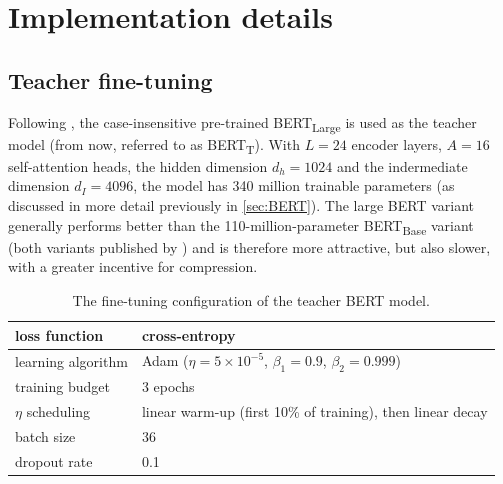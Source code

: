 \documentclass[bsc,frontabs,singlespacing,parskip,deptreport]{infthesis}
\def\BERTT{BERT\textsubscript{T}}
\begin{document}
{  \section{Implementation details}{
    \label{sec:implementation-details}
    \subsection{Teacher fine-tuning}{
      Following \citet{Tang_2019b}, the case-insensitive pre-trained BERT\textsubscript{Large} is used as the teacher model (from now, referred to as \BERTT).
      With $L=24$ encoder layers, $A=16$ self-attention heads, the hidden dimension $d_h=1024$ and the indermediate dimension $d_I=4096$, the model has 340 million trainable parameters (as discussed in more detail previously in \autoref{sec:BERT}).
      The large BERT variant generally performs better than the 110-million-parameter BERT\textsubscript{Base} variant (both variants published by \citet{Devlin_2018}) and is therefore more attractive, but also slower, with a greater incentive for compression.

      \begin{table}[h!t]
      \centering
      \begin{tabular}{m{}|m{}}
      \hline
      loss function & cross-entropy \\
      \hline
      learning algorithm & Adam ($\eta=5\times10^{-5}$, $\beta_1=0.9$, $\beta_2=0.999$) \\
      \hline
      training budget & 3 epochs \\
      \hline
      $\eta$ scheduling & linear warm-up (first 10\% of training), then linear decay \\
      \hline
      batch size & 36 \\
      \hline
      dropout rate & 0.1 \\
      \hline
      \end{tabular}
      \caption{The fine-tuning configuration of the teacher BERT model.}
      \label{tab:initial-config-teacher}
      \end{table}

}}}
\end{document}
